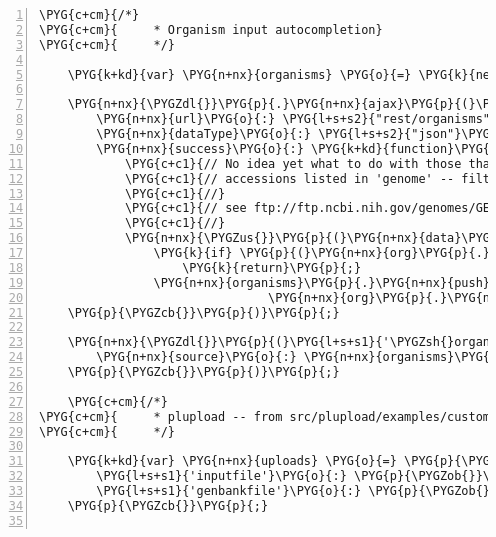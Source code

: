 \begin{Verbatim}[commandchars=\\\{\},numbers=left,firstnumber=1,stepnumber=5]
    \PYG{c+cm}{/*}
\PYG{c+cm}{     * Organism input autocompletion}
\PYG{c+cm}{     */}

    \PYG{k+kd}{var} \PYG{n+nx}{organisms} \PYG{o}{=} \PYG{k}{new} \PYG{n+nb}{Array}\PYG{p}{(}\PYG{p}{)}\PYG{p}{;}

    \PYG{n+nx}{\PYGZdl{}}\PYG{p}{.}\PYG{n+nx}{ajax}\PYG{p}{(}\PYG{p}{\PYGZob{}}
        \PYG{n+nx}{url}\PYG{o}{:} \PYG{l+s+s2}{"rest/organisms"}\PYG{p}{,}
        \PYG{n+nx}{dataType}\PYG{o}{:} \PYG{l+s+s2}{"json"}\PYG{p}{,}
        \PYG{n+nx}{success}\PYG{o}{:} \PYG{k+kd}{function}\PYG{p}{(}\PYG{n+nx}{data}\PYG{p}{)} \PYG{p}{\PYGZob{}}
            \PYG{c+c1}{// No idea yet what to do with those that have multiple}
            \PYG{c+c1}{// accessions listed in 'genome' -- filter them out here for now}
            \PYG{c+c1}{//}
            \PYG{c+c1}{// see ftp://ftp.ncbi.nih.gov/genomes/GENOME\PYGZus{}REPORTS/prokaryotes.txt}
            \PYG{c+c1}{//}
            \PYG{n+nx}{\PYGZus{}}\PYG{p}{(}\PYG{n+nx}{data}\PYG{p}{)}\PYG{p}{.}\PYG{n+nx}{each}\PYG{p}{(}\PYG{k+kd}{function}\PYG{p}{(}\PYG{n+nx}{org}\PYG{p}{)} \PYG{p}{\PYGZob{}}
                \PYG{k}{if} \PYG{p}{(}\PYG{n+nx}{org}\PYG{p}{.}\PYG{n+nx}{acc}\PYG{p}{.}\PYG{n+nx}{indexOf}\PYG{p}{(}\PYG{l+s+s2}{","}\PYG{p}{)} \PYG{o}{\textgreater{}=} \PYG{l+m+mi}{0}\PYG{p}{)}
                    \PYG{k}{return}\PYG{p}{;}
                \PYG{n+nx}{organisms}\PYG{p}{.}\PYG{n+nx}{push}\PYG{p}{(}\PYG{l+s+s2}{"\PYGZob{}\PYGZcb{} (\PYGZob{}\PYGZcb{}/\PYGZob{}\PYGZcb{})"}\PYG{p}{.}\PYG{n+nx}{format}\PYG{p}{(}
                                \PYG{n+nx}{org}\PYG{p}{.}\PYG{n+nx}{title}\PYG{p}{,} \PYG{n+nx}{org}\PYG{p}{.}\PYG{n+nx}{db}\PYG{p}{,} \PYG{n+nx}{org}\PYG{p}{.}\PYG{n+nx}{acc}\PYG{p}{)}\PYG{p}{)}\PYG{p}{;} \PYG{p}{\PYGZcb{}}\PYG{p}{)}\PYG{p}{;} \PYG{p}{\PYGZcb{}}\PYG{p}{,}
    \PYG{p}{\PYGZcb{}}\PYG{p}{)}\PYG{p}{;}

    \PYG{n+nx}{\PYGZdl{}}\PYG{p}{(}\PYG{l+s+s1}{'\PYGZsh{}organismInput'}\PYG{p}{)}\PYG{p}{.}\PYG{n+nx}{typeahead}\PYG{p}{(}\PYG{p}{\PYGZob{}}
        \PYG{n+nx}{source}\PYG{o}{:} \PYG{n+nx}{organisms}\PYG{p}{,}
    \PYG{p}{\PYGZcb{}}\PYG{p}{)}\PYG{p}{;}

    \PYG{c+cm}{/*}
\PYG{c+cm}{     * plupload -- from src/plupload/examples/custom.html}
\PYG{c+cm}{     */}

    \PYG{k+kd}{var} \PYG{n+nx}{uploads} \PYG{o}{=} \PYG{p}{\PYGZob{}}
        \PYG{l+s+s1}{'inputfile'}\PYG{o}{:} \PYG{p}{\PYGZob{}}\PYG{p}{\PYGZcb{}}\PYG{p}{,}
        \PYG{l+s+s1}{'genbankfile'}\PYG{o}{:} \PYG{p}{\PYGZob{}}\PYG{p}{\PYGZcb{}}
    \PYG{p}{\PYGZcb{}}\PYG{p}{;}


\end{Verbatim}
